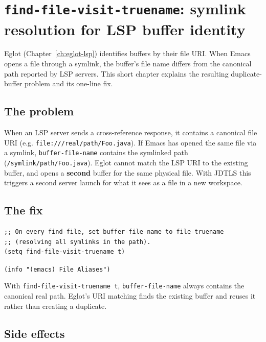 \chapter{\texttt{find-file-visit-truename}: symlink resolution for LSP buffer identity}
\label{ch:find-file-visit-truename}
\minitoc\label{find-file-visit-truename-symlink-resolution-for-lsp-buffer-identity}

Eglot (Chapter~\ref{ch:eglot-lsp}) identifies buffers by their
file URI.  When Emacs opens a file through a symlink, the buffer's file name
differs from the canonical path reported by LSP servers.  This short
chapter explains the resulting duplicate-buffer problem and its
one-line fix.

\section{The problem}\label{the-problem}

When an LSP server sends a cross-reference response, it contains a canonical file URI (e.g. \texttt{file:///real/path/Foo.java}). If Emacs has opened the same file via a symlink, \texttt{buffer-file-name} contains the symlinked path (\texttt{/symlink/path/Foo.java}). Eglot cannot match the LSP URI to the existing buffer, and opens a \textbf{second} buffer for the same physical file. With JDTLS this triggers a second server launch for what it sees as a file in a new workspace.

\section{The fix}\label{the-fix}

\begin{verbatim}
;; On every find-file, set buffer-file-name to file-truename
;; (resolving all symlinks in the path).
(setq find-file-visit-truename t)
\end{verbatim}

\texttt{(info "(emacs) File Aliases")}

With \texttt{find-file-visit-truename t}, \texttt{buffer-file-name} always contains the canonical real path. Eglot's URI matching finds the existing buffer and reuses it rather than creating a duplicate.

\section{Side effects}\label{side-effects}

